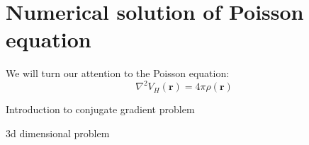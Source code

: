 \chapter{Numerical solution of Poisson equation}

We will turn our attention to the Poisson equation:
\begin{equation}
\nabla^2 V_{H}(\mathbf{r}) = 4\pi\rho(\mathbf{r})
\end{equation}

Introduction to conjugate gradient problem

3d dimensional problem